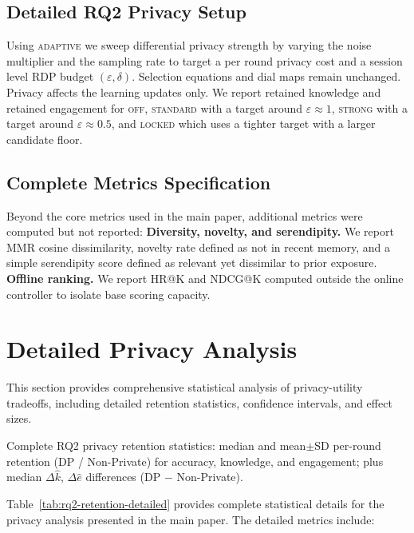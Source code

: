 \subsection{Detailed RQ2 Privacy Setup}
Using \textsc{adaptive} we sweep differential privacy strength by varying the noise multiplier and the sampling rate to target a per round privacy cost and a session level RDP budget $(\varepsilon,\delta)$. Selection equations and dial maps remain unchanged. Privacy affects the learning updates only. We report retained knowledge and retained engagement for \textsc{off}, \textsc{standard} with a target around $\varepsilon\approx 1$, \textsc{strong} with a target around $\varepsilon\approx 0.5$, and \textsc{locked} which uses a tighter target with a larger candidate floor.

\subsection{Complete Metrics Specification}
Beyond the core metrics used in the main paper, additional metrics were computed but not reported:
\textbf{Diversity, novelty, and serendipity.} We report MMR cosine dissimilarity, novelty rate defined as not in recent memory, and a simple serendipity score defined as relevant yet dissimilar to prior exposure.
\textbf{Offline ranking.} We report HR@K and NDCG@K computed outside the online controller to isolate base scoring capacity.

\section{Detailed Privacy Analysis}
\label{app:detailed-privacy}

This section provides comprehensive statistical analysis of privacy-utility tradeoffs, including detailed retention statistics, confidence intervals, and effect sizes.

\begin{table*}[h]
  \centering
  \small
  \caption{Complete RQ2 privacy retention statistics: median and mean$\pm$SD per-round retention (DP / Non-Private) for accuracy, knowledge, and engagement; plus median $\Delta \widehat{k}$, $\Delta \widehat{e}$ differences (DP $-$ Non-Private).}
  \label{tab:rq2-retention-detailed}
\end{table*}

Table~\ref{tab:rq2-retention-detailed} provides complete statistical details for the privacy analysis presented in the main paper. The detailed metrics include:

